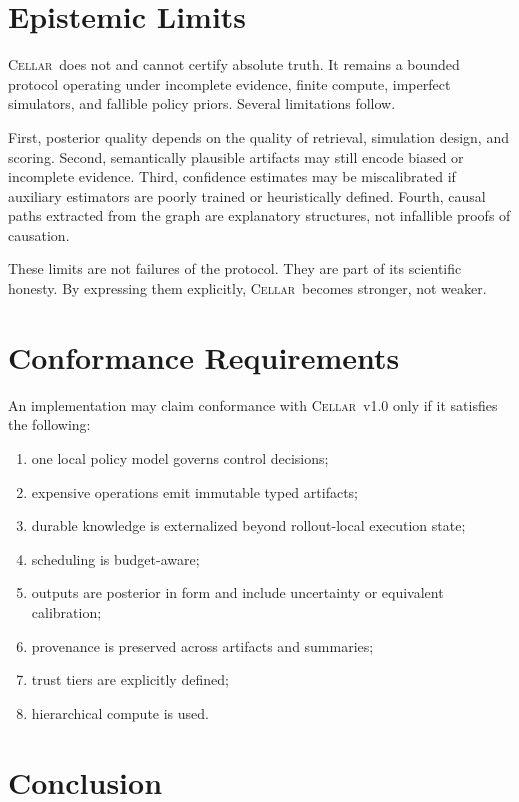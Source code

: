 \documentclass[11pt]{article}
\theoremstyle{definition}
\newcommand{\cellar}{\textsc{Cellar}}
\begin{document}
\section{Epistemic Limits}

\cellar\ does not and cannot certify absolute truth. It remains a bounded protocol operating under incomplete evidence, finite compute, imperfect simulators, and fallible policy priors. Several limitations follow.

First, posterior quality depends on the quality of retrieval, simulation design, and scoring. Second, semantically plausible artifacts may still encode biased or incomplete evidence. Third, confidence estimates may be miscalibrated if auxiliary estimators are poorly trained or heuristically defined. Fourth, causal paths extracted from the graph are explanatory structures, not infallible proofs of causation.

These limits are not failures of the protocol. They are part of its scientific honesty. By expressing them explicitly, \cellar\ becomes stronger, not weaker.

\section{Conformance Requirements}

An implementation may claim conformance with \cellar\ v1.0 only if it satisfies the following:

\begin{enumerate}[leftmargin=1.5em]
    \item one local policy model governs control decisions;
    \item expensive operations emit immutable typed artifacts;
    \item durable knowledge is externalized beyond rollout-local execution state;
    \item scheduling is budget-aware;
    \item outputs are posterior in form and include uncertainty or equivalent calibration;
    \item provenance is preserved across artifacts and summaries;
    \item trust tiers are explicitly defined;
    \item hierarchical compute is used.
\end{enumerate}

\section{Conclusion}
\end{document}
